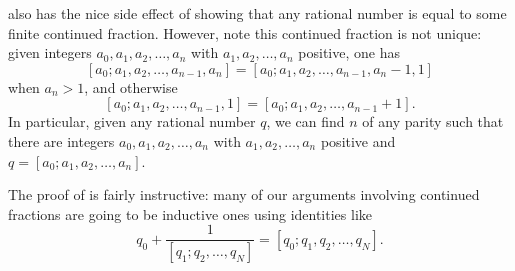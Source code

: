 \documentclass[../notes.tex]{subfiles}
\begin{document}
\begin{remark} \label{rem:adjust-finite-cf}
	 also has the nice side effect of showing that any rational number is equal to some finite continued fraction. However, note this continued fraction is not unique: given integers $a_0,a_1,a_2,\ldots,a_n$ with $a_1,a_2,\ldots,a_n$ positive, one has
	\[[a_0;a_1,a_2,\ldots,a_{n-1},a_n]=[a_0;a_1,a_2,\ldots,a_{n-1},a_n-1,1]\]
	when $a_n>1$, and otherwise
	\[[a_0;a_1,a_2,\ldots,a_{n-1},1]=[a_0;a_1,a_2,\ldots,a_{n-1}+1].\]
	In particular, given any rational number $q$, we can find $n$ of any parity such that there are integers $a_0,a_1,a_2,\ldots,a_n$ with $a_1,a_2,\ldots,a_n$ positive and $q=[a_0;a_1,a_2,\ldots,a_n]$.
\end{remark}
The proof of  is fairly instructive: many of our arguments involving continued fractions are going to be inductive ones using identities like
\[q_0+\frac1{[q_1;q_2,\ldots,q_N]}=[q_0;q_1,q_2,\ldots,q_N].\]
\end{document}
